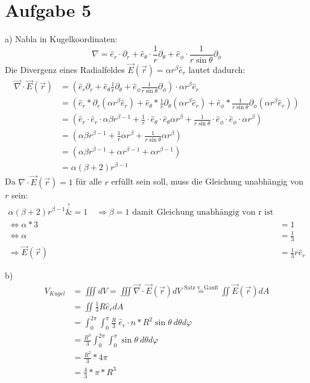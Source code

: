 \documentclass[a4paper]{article}
\newcommand{\delr}{\partial_r}
\newcommand{\delp}{\partial_\phi}
\newcommand{\delt}{\partial_\theta}
\newcommand{\er}{\hat{e}_r}
\newcommand{\et}{\hat{e}_\theta}
\newcommand{\ep}{\hat{e}_\phi}
\begin{document}
\newpage

\section*{Aufgabe 5}
\par{a)}
Nabla in Kugelkoordinaten:
\[ \nabla = \er \cdot \delr + \et \cdot \frac{1}{r} \delt + \ep \cdot \frac{1}{r \sin\theta} \delp \]
Die Divergenz eines Radialfeldes $\vec{E}(\vec{r}) = \alpha r^\beta \er$ lautet dadurch:
\begin{align*}
	\vec{\nabla} \cdot \vec{E}(\vec{r}) 
	&= \left(  \er \delr + \et \frac{1}{r} \delt + \ep  \frac{1}{r \sin\theta} \delp \right) \cdot \alpha r^\beta \er \\
	&= \left(\er * \delr (\alpha r^\beta \er )
		+ \et * \frac{1}{r} \delt (\alpha r^\beta \er )
		+ \ep * \frac{1}{r\sin\theta} \delp (\alpha r^\beta \er) \right) \\
	&= \left(\er \cdot \er \cdot \alpha \beta r^{\beta - 1}
		+ \frac{1}{r} \cdot \et \cdot \et \alpha r^\beta
		+ \frac{1}{r\sin\theta} \cdot \ep \cdot \ep \cdot \alpha r^\beta \right) \\
	&= \left(\alpha \beta r^{\beta - 1}
		+ \frac{1}{r} \alpha r^\beta
		+ \frac{1}{r\sin\theta}  \alpha r^\beta \right) \\
	&= \left( \alpha\beta r^{\beta - 1} +\alpha r^{\beta - 1} +\alpha r^{\beta - 1} \right) \\
	&= \alpha (\beta + 2) r^{\beta - 1}
\end{align*}
Da $\nabla \cdot \vec{E}(\vec{r}) = 1$ für alle $r$ erfüllt sein soll, muss die Gleichung unabhängig von $r$ sein:
\begin{align*}
	\alpha (\beta + 2) r^{\beta - 1} \overset{!}&{=} 1
	\quad \Rightarrow
	\beta = 1 \text{ damit Gleichung unabhängig von r ist}
	\\
	\Leftrightarrow
	\alpha * 3 &= 1 \\
	\Leftrightarrow
	\alpha &= \frac{1}{3} \\
	\Rightarrow \vec{E}(\vec{r}) &= \frac{1}{3} r \hat{e}_r
\end{align*}

\par{b)}
\begin{align*}
	V_{Kugel} 
	&= \iiint dV = \iiint \vec{\nabla} \cdot \vec{E}(\vec{r})dV \overset{\text{Satz v. Gauß}}{=}
	\iint \vec{E}(\vec{r})dA \\
	&= \iint \frac{1}{3} R \hat{e}_r dA \\
	&= \int_0^{2\pi} \int_0^\pi \frac{R}{3} \ \hat{e}_r \cdot \hat{n} * R^2\sin\theta \ d\theta d\varphi \\
	&= \frac{R^3}{3} \int_0^{2\pi} \int_0^\pi \sin\theta \ d\theta d\varphi \\
	&= \frac{R^2}{3} * 4\pi \\
	&= \frac{4}{3} * \pi * R^3
\end{align*}
\end{document}
